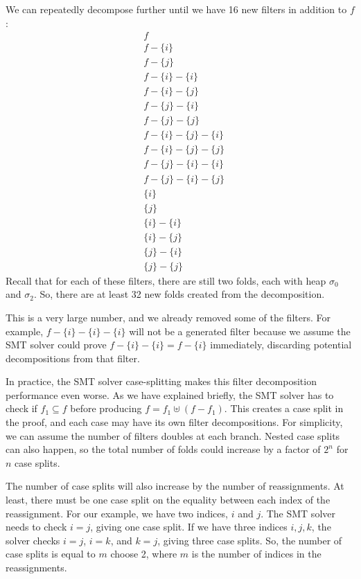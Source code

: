 \documentclass[msc,oneside]{ubcthesis}
\theoremstyle{definition}
\begin{document}
We can repeatedly decompose further until we have 16 new filters in addition to $f$:
\begin{align*} 
&f \\
&f - \{i\}  \\
&f - \{j\}  \\
&f - \{i\} - \{i\}   \\
&f - \{i\} - \{j\}   \\
&f - \{j\} - \{i\}   \\
&f - \{j\} - \{j\}   \\
&f - \{i\} - \{j\} - \{i\}   \\
&f - \{i\} - \{j\} - \{j\}   \\
&f - \{j\} - \{i\} - \{i\}  \\
&f - \{j\} - \{i\} - \{j\}  \\
&\{i\}  \\
&\{j\}  \\
&\{i\} -\{i\}  \\
&\{i\} -\{j\}  \\
&\{j\} -\{i\}  \\
&\{j\} -\{j\}  
\end{align*}
Recall that for each of these filters, there are still two folds, each with heap $\sigma_0$ and $\sigma_2$. So, there are at least 32 new folds created from the decomposition. 

This is a very large number, and we already removed some of the filters. For example, $f - \{i\} - \{i\} - \{i\}$ will not be a generated filter because we assume the SMT solver could prove $f - \{i\} - \{i\} = f - \{i\}$ immediately, discarding potential decompositions from that filter.

In practice, the SMT solver case-splitting makes this filter decomposition performance even worse. As we have explained briefly, the SMT solver has to check if $f_1 \subseteq f$ before producing $f = f_1 \uplus (f - f_1)$. This creates a case split in the proof, and each case may have its own filter decompositions. For simplicity, we can assume the number of filters doubles at each branch. Nested case splits can also happen, so the total number of folds could increase by a factor of $2^n$ for $n$ case splits. 

The number of case splits will also increase by the number of reassignments. At least, there must be one case split on the equality between each index of the reassignment. For our example, we have two indices, $i$ and $j$. The SMT solver needs to check $i = j$, giving one case split. If we have three indices $i,j,k$, the solver checks $i=j$, $i=k$, and $k=j$, giving three case splits. So, the number of case splits is equal to $m$ choose 2, where $m$ is the number of indices in the reassignments.
\end{document}

